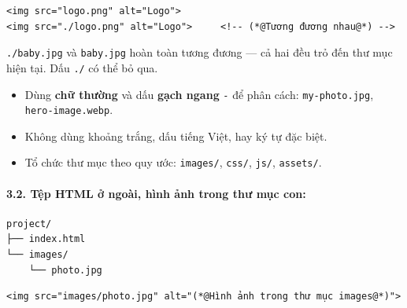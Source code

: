 \documentclass[11pt,oneside]{book}
\newcommand{\codeinline}[1]{\textcolor{accentOrange}{\texttt{#1}}}
\begin{document}
\begin{codeWindow}
\begin{lstlisting}[language=HTML5]
<img src="logo.png" alt="Logo">
<img src="./logo.png" alt="Logo">     <!-- (*@Tương đương nhau@*) -->
\end{lstlisting}
\end{codeWindow}

\begin{noteBox}
\codeinline{./baby.jpg} và \codeinline{baby.jpg} hoàn toàn tương đương — cả hai đều trỏ đến thư mục hiện tại. Dấu \codeinline{./} có thể bỏ qua.
\end{noteBox}

\begin{tipBox}
\begin{itemize}[leftmargin=1.5em, itemsep=2pt, parsep=0pt]
    \item Dùng \textbf{chữ thường} và dấu \textbf{gạch ngang} \codeinline{-} để phân cách: \codeinline{my-photo.jpg}, \codeinline{hero-image.webp}.
    \item Không dùng khoảng trắng, dấu tiếng Việt, hay ký tự đặc biệt.
    \item Tổ chức thư mục theo quy ước: \codeinline{images/}, \codeinline{css/}, \codeinline{js/}, \codeinline{assets/}.
\end{itemize}
\end{tipBox}

\paragraph{3.2. Tệp HTML ở ngoài, hình ảnh trong thư mục con:}

\begin{codeWindow}
\begin{lstlisting}[language=HTML5]
project/
├── index.html
└── images/
    └── photo.jpg
\end{lstlisting}
\end{codeWindow}

\begin{codeWindow}
\begin{lstlisting}[language=HTML5]
<img src="images/photo.jpg" alt="(*@Hình ảnh trong thư mục images@*)">
\end{lstlisting}
\end{codeWindow}
\end{document}
